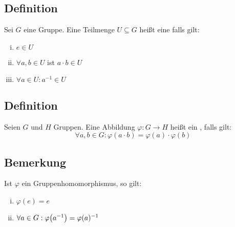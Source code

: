 \subsection[Definition: Untergruppe]{Definition} %
\label{sub:18}
Sei $G$ eine Gruppe. Eine Teilmenge $U \subseteq G$ heißt eine  falls gilt:
\begin{multicols}{3}
	\begin{enumerate}[(i)]
		\item $e \in U$
		\item $\forall a,b \in U$ ist $a \cdot b \in U$
		\item $\forall a \in U : a ^{-1} \in U$
	\end{enumerate}
\end{multicols}

\subsection[Definition: Gruppenhomomorphismus]{Definition} %
\label{sub:19}
Seien $G$ und $H$ Gruppen. Eine Abbildung $\varphi : G \to H$ heißt ein , falls gilt:
\[
	\forall a,b \in G : \varphi(a \cdot b) = \varphi(a) \cdot \varphi(b)
\] 

\subsection[Bemerkung: Eigenschaften von Gruppenhomomorphismen]{Bemerkung} %
\label{sub:110}
Ist $\varphi$ ein Gruppenhomomorphismus, so gilt: 
\begin{multicols}{2}
	\begin{enumerate}[(i)]
		\item $\varphi(e) =e$
		\item $\forall a \in G : \varphi \enbrace*{ a ^{-1}} = \varphi(a) ^{-1} $
	\end{enumerate}
\end{multicols}

